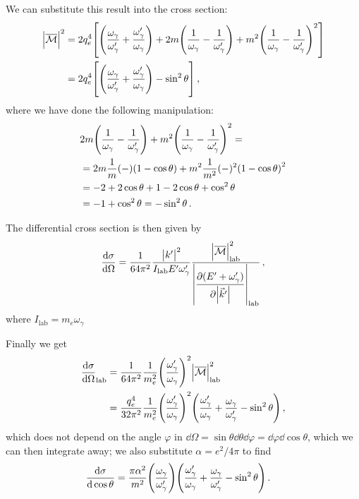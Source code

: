 \documentclass[main.tex]{subfiles}
\begin{document}
We can substitute this result into the cross section: 
%
\begin{align}
\abs{\mathcal{\overline{M}}}^2 
&= 2 q_e^{4}  \qty[
\qty(
    \frac{\omega_\gamma}{\omega_\gamma'} +
    \frac{\omega_\gamma'}{\omega_\gamma}
)
+ 2 m
\qty(
    \frac{1}{\omega_\gamma} -
    \frac{1}{\omega_\gamma '} 
)
+ m^{2} 
\qty(
    \frac{1}{\omega_\gamma} -
    \frac{1}{\omega_\gamma '} 
)^2  
]  \\
&= 2 q_e^{4} \qty[
\qty(
    \frac{\omega_\gamma}{\omega_\gamma'} +
    \frac{\omega_\gamma'}{\omega_\gamma}
)
-\sin^2\theta 
]
\,,
\end{align}
%
where we have done the following manipulation: 
%
\begin{align}
&2 m
\qty(
    \frac{1}{\omega_\gamma} -
    \frac{1}{\omega_\gamma '} 
)
+ m^2
\qty(
    \frac{1}{\omega_\gamma} -
    \frac{1}{\omega_\gamma '} 
)^2  = \\
&= 2m \frac{1}{m} (-) \qty(1 - \cos \theta )
+ m^2 \frac{1}{m^2} (-)^2 \qty(1 - \cos \theta )^2  \\
&= -2 + 2 \cos \theta + 1 - 2 \cos \theta + \cos^2 \theta   \\
&= - 1 + \cos^2\theta = -\sin^2\theta 
\,.
\end{align}

The differential cross section is then given by 
%
\begin{align}
\dv{\sigma }{\Omega } = \frac{1}{64 \pi^2} \frac{\abs{k'}^2}{I _{\text{lab}} E' \omega_{\gamma}'}
\frac{\abs{\mathcal{\overline{M}}}^2 _{\text{lab}}}{\displaystyle \abs{\pdv{(E' + \omega_{\gamma }')}{\abs{\vec{k}'}} }_{\text{lab}}}
\,,
\end{align}
%
where \(I _{\text{lab}} = m_e \omega_{\gamma }\)


Finally we get 
%
\begin{align}
\dv{\sigma }{\Omega } _{\text{lab}} &= \frac{1}{64 \pi^2} \frac{1}{m_e^2} \qty(\frac{\omega_{\gamma }'}{\omega_{\gamma }})^2 
\abs{\mathcal{\overline{M}}}^2 _{\text{lab}}  \\
&= \frac{q_e^{4}}{32 \pi^2} \frac{1}{m_e^2} \qty(\frac{\omega_{\gamma }'}{\omega_{\gamma }})^2 
\qty(\frac{\omega_{\gamma }'}{\omega_{\gamma }} + \frac{\omega_{\gamma }}{\omega_{\gamma }'} - \sin^2\theta )
\,,
\end{align}
%
which does not depend on the angle \(\varphi  \) in \(\dd{\Omega } = \sin \theta \dd{\theta } \dd{\varphi } = \dd{\varphi } \dd{\cos \theta }\), which we can then integrate away; we also substitute \(\alpha = e^2 / 4 \pi \) to find 
%
\begin{align}
\dv{\sigma }{\cos \theta } 
&= \frac{\pi \alpha^2}{m^2} \qty(\frac{\omega_{\gamma }}{\omega_{\gamma }'})
\qty(\frac{\omega_{\gamma }'}{\omega_{\gamma }} + \frac{\omega_{\gamma }}{\omega_{\gamma }'} - \sin^2\theta )
\,.
\end{align}
\end{document}
